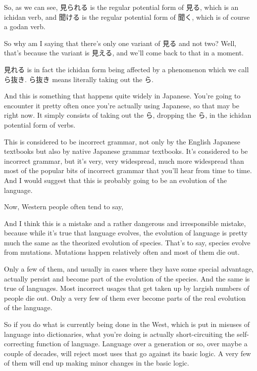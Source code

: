 {}

So, as we can see, 見られる is the regular potential form of 見る, which is an ichidan verb, and 聞ける is the regular potential form of 聞く, which is of course a godan verb.

So why am I saying that there's only one variant of 見る and not two? Well, that's because the variant is 見える, and we'll come back to that in a moment.

見れる is in fact the ichidan form being affected by a phenomenon which we call ら抜き. ら抜き means literally taking out the ら.

{}

And this is something that happens quite widely in Japanese. You're going to encounter it pretty often once you're actually using Japanese, so that may be right now. It simply consists of taking out the ら, dropping the ら, in the ichidan potential form of verbs.

This is considered to be incorrect grammar, not only by the English Japanese textbooks but also by native Japanese grammar textbooks. It's considered to be incorrect grammar, but it's very, very widespread, much more widespread than most of the popular bits of incorrect grammar that you'll hear from time to time. And I would suggest that this is probably going to be an evolution of the language.

Now, Western people often tend to say, 

And I think this is a mistake and a rather dangerous and irresponsible mistake, because while it's true that language evolves, the evolution of language is pretty much the same as the theorized evolution of species. That's to say, species evolve from mutations. Mutations happen relatively often and most of them die out.

Only a few of them, and usually in cases where they have some special advantage, actually persist and become part of the evolution of the species. And the same is true of languages. Most incorrect usages that get taken up by largish numbers of people die out. Only a very few of them ever become parts of the real evolution of the language.

So if you do what is currently being done in the West, which is put in misuses of language into dictionaries, what you're doing is actually short-circuiting the self-correcting function of language. Language over a generation or so, over maybe a couple of decades, will reject most uses that go against its basic logic. A very few of them will end up making minor changes in the basic logic.

